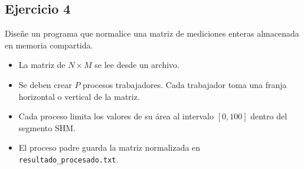 \documentclass[12pt,a4paper]{article}
\begin{document}
\subsection*{Ejercicio 4}
Diseñe un programa que normalice una matriz de mediciones enteras almacenada en memoria compartida.
\begin{itemize}
    \item La matriz de $N \times M$ se lee desde un archivo.
    \item Se deben crear $P$ procesos trabajadores. Cada trabajador toma una franja horizontal o vertical de la matriz.
    \item Cada proceso limita los valores de su área al intervalo $[0,100]$ dentro del segmento SHM.
    \item El proceso padre guarda la matriz normalizada en \texttt{resultado\_procesado.txt}.
\end{itemize}

\begin{center}
\end{center}
\end{document}

